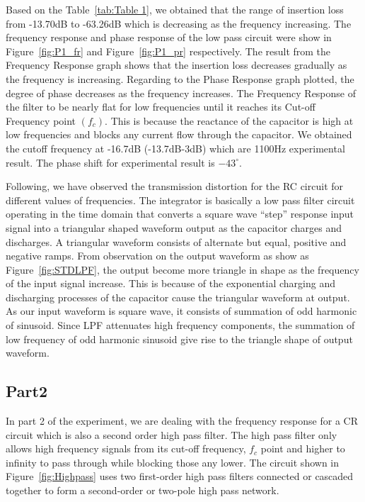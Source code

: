 \documentclass[a4paper, 12pt, english]{article}
\begin{document}
Based on the Table~\ref{tab:Table 1}, we obtained that the range of insertion loss from -13.70dB to -63.26dB which is decreasing as the frequency increasing. The frequency response and phase response of the low pass circuit were show in Figure~\ref{fig:P1_fr} and Figure~\ref{fig:P1_pr} respectively. The result from the Frequency Response graph shows that the insertion loss decreases gradually as the frequency is increasing. Regarding to the Phase Response graph plotted, the degree of phase decreases as the frequency increases. The Frequency Response of the filter to be nearly flat for low frequencies until it reaches its Cut-off Frequency point $(f_{c})$. This is because the reactance of the capacitor is high at low frequencies and blocks any current flow through the capacitor. We obtained the cutoff frequency at -16.7dB (-13.7dB-3dB) which are 1100Hz experimental result. The phase shift for experimental result is $-43^{\circ}$. 
\newline

Following, we have observed the transmission distortion for the RC circuit for different values of frequencies. The integrator is basically a low pass filter circuit operating in the time domain that converts a square wave “step” response input signal into a triangular shaped waveform output as the capacitor charges and discharges. A triangular waveform consists of alternate but equal, positive and negative ramps. From observation on the output waveform as show as Figure~\ref{fig:STDLPF}, the output become more triangle in shape as the frequency of the input signal increase. This is because of the exponential charging and discharging processes of the capacitor cause the triangular waveform at output. As our input waveform is square wave, it consists of summation of odd harmonic of sinusoid. Since LPF attenuates high frequency components, the summation of low frequency of odd harmonic sinusoid give rise to the triangle shape of output waveform.

\subsection{Part2}
In part 2 of the experiment, we are dealing with the frequency response for a CR circuit which is also a second order high pass filter.  The high pass filter only allows high frequency signals from its cut-off frequency, $f_{c}$ point and higher to infinity to pass through while blocking those any lower. The circuit shown in Figure~\ref{fig:Highpass} uses two first-order high pass filters connected or cascaded together to form a second-order or two-pole high pass network. 
\newline
\end{document}
